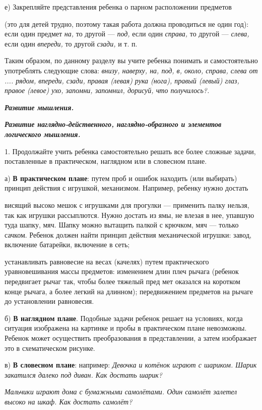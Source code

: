 \documentclass{book}
\renewcommand{\emph}[1]{\textit{#1}}
\begin{document}
е) Закрепляйте представления ребенка о парном расположении предметов

(это для детей трудно, поэтому такая работа должна проводиться не один
год): если один предмет \emph{на,} то другой --- \emph{под,} если один
\emph{справа,} то другой --- \emph{слева,} если один \emph{впереди,} то
другой \emph{сзади,} и т. п.

Таким образом, по данному разделу вы учите ребенка понимать и
самостоятельно употреблять следующие слова: \emph{внизу, наверху, на,
под, в, около, справа, слева от .... рядом, впереди, сзади, правая
(левая) рука (нога), правый (левый) глаз, правое (левое) ухо, запомни,
запомнил, дорисуй, что получилось?.}

\emph{\textbf{Развитие мышления.}}

\emph{\textbf{Развитие наглядно-действенного, наглядно-образного и
элементов логического мышления.}}

1. Продолжайте учить ребенка самостоятельно решать все более сложные
задачи, поставленные в практическом, наглядном или в словесном плане.

а) \textbf{В практическом плане}: путем проб и ошибок находить (или
выбирать) принцип действия с игрушкой, механизмом. Например, ребенку
нужно достать

висящий высоко мешок с игрушками для прогулки --- применить палку
нельзя, так как игрушки рассыплются. Нужно достать из ямы, не влезая в
нее, упавшую туда шапку, мяч. Шапку можно вытащить палкой с крючком, мяч
--- только сачком. Ребенок должен найти принцип действия механической
игрушки: завод, включение батарейки, включение в сеть;

устанавливать равновесие на весах (качелях) путем практического
уравновешивания массы предметов: изменением длин плеч рычага (ребенок
передвигает рычаг так, чтобы более тяжелый пред мет оказался на коротком
конце рычага, а более легкий на длинном); передвижением предметов на
рычаге до установлении равновесия.

б) \textbf{В наглядном плане}. Подобные задачи ребенок решает на
условиях, когда ситуация изображена на картинке и пробы в практическом
плане невозможны. Ребенок может осуществить преобразования в
представлении, а затем изображает это в схематическом рисунке.

в) \textbf{В словесном плане}: например: \emph{Девочка и котёнок играют
с шариком. Шарик закатился далеко под диван. Как достать шарик?}

\emph{Мальчики играют дома с бумажными самолётами. Один самолёт залетел
высоко на шкаф. Как достать самолёт?}
\end{document}
